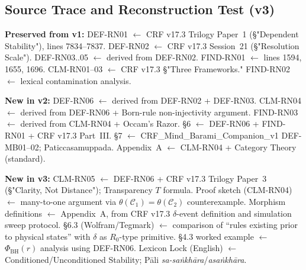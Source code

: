 \documentclass[12pt, a4paper]{article}
\begin{document}
\subsection{Source Trace and Reconstruction Test (v3)}

\begin{formalbox}[title={Source Trace (v3, complete)}]
\textbf{Preserved from v1:}
DEF-RN01 $\leftarrow$ CRF v17.3 Trilogy Paper~1 (\S"Dependent
Stability"), lines 7834--7837. DEF-RN02 $\leftarrow$ CRF v17.3
Session~21 (\S"Resolution Scale"). DEF-RN03..05 $\leftarrow$
derived from DEF-RN02. FIND-RN01 $\leftarrow$ lines 1594, 1655,
1696. CLM-RN01--03 $\leftarrow$ CRF v17.3 \S"Three Frameworks."
FIND-RN02 $\leftarrow$ lexical contamination analysis.

\textbf{New in v2:}
DEF-RN06 $\leftarrow$ derived from DEF-RN02 + DEF-RN03.
CLM-RN04 $\leftarrow$ derived from DEF-RN06 + Born-rule
non-injectivity argument.
FIND-RN03 $\leftarrow$ derived from CLM-RN04 + Occam's Razor.
\S6 $\leftarrow$ DEF-RN06 + FIND-RN01 + CRF v17.3 Part~III.
\S7 $\leftarrow$ CRF\_Mind\_Barami\_Companion\_v1 DEF-MB01--02;
Paticcasamuppada.
Appendix~A $\leftarrow$ CLM-RN04 + Category Theory (standard).

\textbf{New in v3:}
CLM-RN05 $\leftarrow$ DEF-RN06 + CRF v17.3 Trilogy Paper~3
(\S"Clarity, Not Distance"); Transparency $T$ formula.
Proof sketch (CLM-RN04) $\leftarrow$ many-to-one argument via
$\theta(\mathcal{C}_1) = \theta(\mathcal{C}_2)$ counterexample.
Morphism definitions $\leftarrow$ Appendix~A, from CRF v17.3
$\delta$-event definition and simulation sweep protocol.
\S6.3 (Wolfram/Tegmark) $\leftarrow$ comparison of ``rules
existing prior to physical states'' with $\delta$ as $R_0$-type
primitive.
\S4.3 worked example $\leftarrow$ $\Phi_{\mathrm{BH}}(r)$ analysis
using DEF-RN06.
Lexicon Lock (English) $\leftarrow$ Conditioned/Unconditioned
Stability; Pāli \emph{sa-saṅkhāra}/\emph{asaṅkhāra}.
\end{formalbox}
\end{document}
